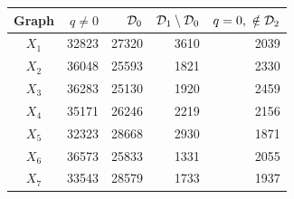 \begin{tabular}{crrrr}
\toprule
Graph & \(q\ne0\) & \(\mathcal D_0\) & \(\mathcal D_1\setminus\mathcal D_0\) & \(q=0,\ \notin\D_2\)\\\midrule
\(X_1\)&32823&27320&3610&2039\\
\(X_2\)&36048&25593&1821&2330\\
\(X_3\)&36283&25130&1920&2459\\
\(X_4\)&35171&26246&2219&2156\\
\(X_5\)&32323&28668&2930&1871\\
\(X_6\)&36573&25833&1331&2055\\
\(X_7\)&33543&28579&1733&1937\\
\bottomrule
\end{tabular}
